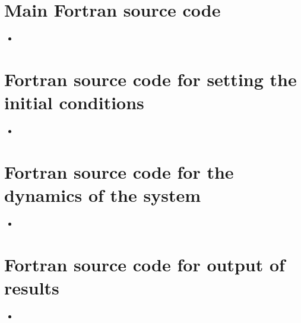 \documentclass[
10pt, %
a4paper, %
oneside, %
headinclude,footinclude, %
BCOR5mm, %
]{scrartcl}
\newcommand{\insertcode}[2]{\begin{itemize}\item[]\end{itemize}} %
\begin{document}
\begin{appendices}

\section{Main Fortran source code}


\insertcode{"../argon_box.f90"}{argon\_box.f90} %


\newpage


\section{Fortran source code for setting the initial conditions}


\insertcode{"../argon_box_init.f90"}{argon\_box\_init.f90} %


\newpage


\section{Fortran source code for the dynamics of the system}


\insertcode{"../argon_box_dynamics.f90"}{argon\_box\_dynamics.f90} %


\newpage


\section{Fortran source code for output of results}


\insertcode{"../argon_box_results.f90"}{argon\_box\_results.f90} %


\newpage

\end{appendices}
\end{document}
